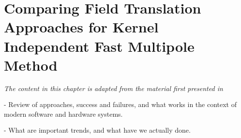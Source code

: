 \chapter{Comparing Field Translation Approaches for Kernel Independent Fast Multipole Method}\label{chpt:field_translation}
\thispagestyle{chaptertitle} %


\begin{center}
    \textit{The content in this chapter is adapted from the material first presented in \cite{kailasa2024m2ltranslationoperatorskernel} }
\end{center}

- Review of approaches, success and failures, and what works in the context of modern software and hardware systems.

- What are important trends, and what have we actually done.
